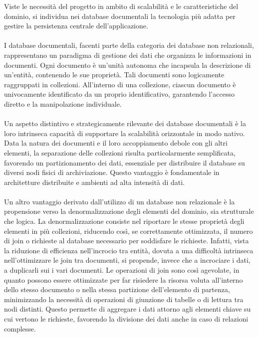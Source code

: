 Viste le necessità del progetto in ambito di scalabilità
e le caratteristiche del dominio,
si individua nei database documentali la tecnologia più adatta
per gestire la persistenza centrale dell'applicazione.\\
\\
I database documentali, facenti parte della categoria dei database non relazionali,
rappresentano un paradigma di gestione dei dati
che organizza le informazioni in documenti.
Ogni documento è un'unità autonoma che incapsula la descrizione di un'entità,
contenendo le sue proprietà.
Tali documenti sono logicamente raggruppati in collezioni.
All'interno di una collezione,
ciascun documento è univocamente identificato da un proprio identificativo,
garantendo l'accesso diretto e la manipolazione individuale.\\
\\
Un aspetto distintivo e strategicamente rilevante dei database documentali è
la loro intrinseca capacità di supportare la scalabilità orizzontale in modo nativo.
Data la natura dei documenti e il loro accoppiamento debole con gli altri elementi,
la separazione delle collezioni risulta particolarmente semplificata,
favorendo un partizionamento dei dati,
essenziale per distribuire il database su diversi nodi fisici di archiviazione.
Questo vantaggio è fondamentale in architetture distribuite e ambienti ad alta intensità di dati.\\
\\
Un altro vantaggio derivato dall'utilizzo di un database non relazionale
è la propensione verso la denormalizzazione degli elementi del dominio,
sia strutturale che logica.
La denormalizzazione consiste nel riportare le stesse proprietà degli elementi in più collezioni,
riducendo così, se correttamente ottimizzata,
il numero di join o richieste al database necessario per soddisfare le richieste.
Infatti, vista la riduzione di efficienza nell'incrocio tra entità,
dovuta a una difficoltà intrinseca nell'ottimizzare le join tra documenti,
si propende, invece che a incrociare i dati, a duplicarli sui i vari documenti.
Le operazioni di join sono così agevolate,
in quanto possono essere ottimizzate per
far risiedere la risorsa voluta all'interno dello stesso documento o nella stessa partizione dell'elemento di partenza,
minimizzando la necessità di operazioni di giunzione di tabelle o di lettura tra nodi distinti.
Questo permette di aggregare i dati attorno agli elementi chiave su cui vertono le richieste,
favorendo la divisione dei dati anche in caso di relazioni complesse.\\

